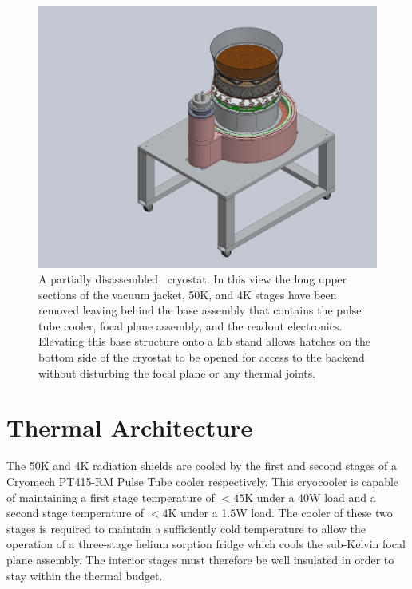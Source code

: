 \documentclass[]{spie}  %
\begin{document}
\begin{figure} [h]
	\begin{center}
		\includegraphics[scale=0.4]{base_on_lowboy.JPG}
	\end{center}
	\caption{A partially disassembled \biceparray\ cryostat. In this view
	the long upper sections of the vacuum jacket, 50K, and 4K stages have been
	removed leaving behind the base assembly that contains the pulse tube cooler,
	focal plane assembly, and the readout electronics. Elevating this base
	structure onto a lab stand allows hatches on the bottom side of the cryostat to
	be opened for access to the backend without disturbing the focal plane or any
	thermal joints.
	}
	\label{fig:base}
\end{figure}


\section{Thermal Architecture}
\label{sec:thermal_architecture}

 The 50K and 4K radiation shields are cooled by the first
and second stages of a Cryomech PT415-RM Pulse Tube cooler respectively. This
cryocooler is capable of maintaining a first stage temperature of $<45$K under
a 40W load and a second stage temperature of $<4$K under a
1.5W load. The cooler of these two stages is required to maintain a
sufficiently cold temperature to allow the operation of a three-stage helium
sorption fridge which cools the sub-Kelvin focal plane assembly. The interior stages must
therefore be well insulated in order to stay within the thermal budget.
\end{document}
